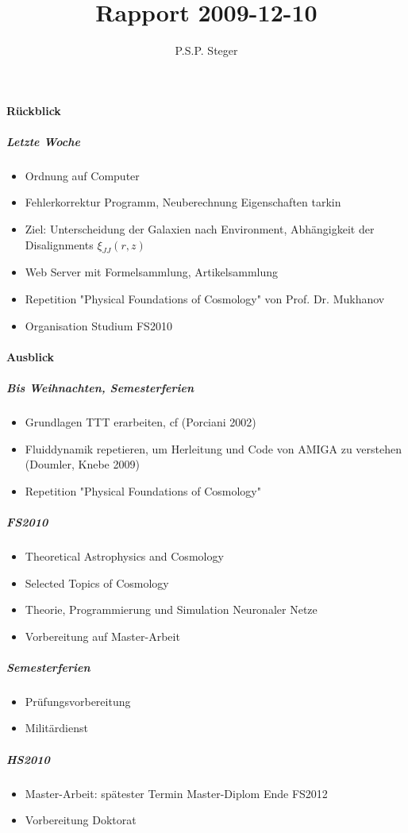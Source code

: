 \documentclass[10pt]{report}
\begin{document}
%
\begin{titlepage}
 \title{Rapport 2009-12-10}
 \author{P.S.P. Steger}
 \maketitle
\end{titlepage}
%

%
\paragraph{R\"uckblick}
%
\subparagraph{Letzte Woche}
%
\begin{itemize}
\item Ordnung auf Computer
\item Fehlerkorrektur Programm, Neuberechnung Eigenschaften tarkin
\item Ziel: Unterscheidung der Galaxien nach Environment, Abh\"angigkeit der Disalignments $\xi_{JJ}(r,z)$
\item Web Server mit Formelsammlung, Artikelsammlung
\item Repetition "Physical Foundations of Cosmology" von Prof. Dr. Mukhanov
\item Organisation Studium FS2010
\end{itemize}
%
\paragraph{Ausblick}
%
\subparagraph{Bis Weihnachten, Semesterferien}
%
\begin{itemize}
\item Grundlagen TTT erarbeiten, cf (Porciani 2002)
\item Fluiddynamik repetieren, um Herleitung und Code von AMIGA zu verstehen (Doumler, Knebe 2009)
\item Repetition "Physical Foundations of Cosmology"
\end{itemize}
%
\subparagraph{FS2010}
%
\begin{itemize}
\item Theoretical Astrophysics and Cosmology
\item Selected Topics of Cosmology
\item Theorie, Programmierung und Simulation Neuronaler Netze
\item Vorbereitung auf Master-Arbeit
\end{itemize}
%
\subparagraph{Semesterferien}
%
\begin{itemize}
\item Pr\"ufungsvorbereitung
\item Milit\"ardienst
\end{itemize}
%
\subparagraph{HS2010}
%
\begin{itemize}
\item Master-Arbeit: sp\"atester Termin Master-Diplom Ende FS2012
\item Vorbereitung Doktorat
\end{itemize}
%
%
\end{document}
